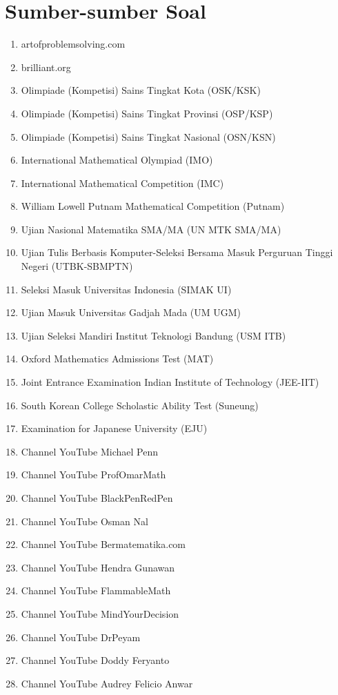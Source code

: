 \chapter{Sumber-sumber Soal}

\begin{enumerate}[leftmargin=*]
	\item artofproblemsolving.com
	\item brilliant.org
	\item Olimpiade (Kompetisi) Sains Tingkat Kota (OSK/KSK)
	\item Olimpiade (Kompetisi) Sains Tingkat Provinsi (OSP/KSP)
	\item Olimpiade (Kompetisi) Sains Tingkat Nasional (OSN/KSN)
	\item International Mathematical Olympiad (IMO)
	\item International Mathematical Competition (IMC)
	\item William Lowell Putnam Mathematical Competition (Putnam)
	\item Ujian Nasional Matematika SMA/MA (UN MTK SMA/MA)
	\item Ujian Tulis Berbasis Komputer-Seleksi Bersama Masuk Perguruan Tinggi Negeri (UTBK-SBMPTN)
	\item Seleksi Masuk Universitas Indonesia (SIMAK UI)
	\item Ujian Masuk Universitas Gadjah Mada (UM UGM)
	\item Ujian Seleksi Mandiri Institut Teknologi Bandung (USM ITB)
	\item Oxford Mathematics Admissions Test (MAT)
	\item Joint Entrance Examination Indian Institute of Technology (JEE-IIT)
	\item South Korean College Scholastic Ability Test (Suneung)
	\item Examination for Japanese University (EJU)
	\item Channel YouTube Michael Penn
	\item Channel YouTube ProfOmarMath
	\item Channel YouTube BlackPenRedPen
	\item Channel YouTube Osman Nal
	\item Channel YouTube Bermatematika.com
	\item Channel YouTube Hendra Gunawan
	\item Channel YouTube FlammableMath
	\item Channel YouTube MindYourDecision
	\item Channel YouTube DrPeyam
	\item Channel YouTube Doddy Feryanto
	\item Channel YouTube Audrey Felicio Anwar
\end{enumerate}